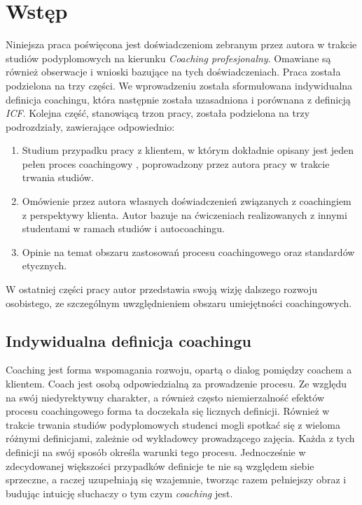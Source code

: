 \chapter{Wstęp}


Niniejsza praca poświęcona jest doświadczeniom zebranym przez autora w trakcie studiów podyplomowych na kierunku
\emph{Coaching profesjonalny}. Omawiane są również obserwacje i wnioski bazujące na tych doświadczeniach.
Praca została podzielona na trzy części. We wprowadzeniu została sformułowana indywidualna definicja coachingu,
która następnie została uzasadniona i porównana z definicją \emph{ICF}. Kolejna część, stanowiącą trzon pracy,
została podzielona na trzy podrozdziały, zawierające odpowiednio:
\begin{enumerate}
  \item Studium przypadku pracy z klientem, w którym dokładnie opisany jest jeden pełen proces coachingowy  , poprowadzony
      przez autora pracy w trakcie trwania studiów.
  \item Omówienie przez autora własnych doświadczenień związanych z coachingiem z perspektywy klienta. Autor bazuje na
      ćwiczeniach realizowanych z innymi studentami w ramach studiów i autocoachingu.
  \item Opinie na temat obszaru zastosowań procesu coachingowego oraz standardów etycznych.
\end{enumerate}
W ostatniej części pracy autor przedstawia swoją wizję dalszego rozwoju osobistego, ze szczególnym uwzględnieniem
obszaru umiejętności coachingowych. \\

\section{Indywidualna definicja coachingu}
Coaching jest forma wspomagania rozwoju, opartą o dialog pomiędzy coachem a klientem. Coach jest osobą odpowiedzialną za prowadzenie procesu.
Ze względu na swój niedyrektywny charakter, a również często niemierzalność efektów procesu coachingowego forma ta doczekała się
licznych definicji. Również w trakcie trwania studiów podyplomowych studenci mogli spotkać się z wieloma różnymi definicjami,
zależnie od wykładowcy prowadzącego zajęcia. Każda z tych definicji na swój sposób określa warunki tego procesu.
Jednocześnie w zdecydowanej większości przypadków definicje te nie są względem siebie sprzeczne, a raczej uzupełniają się
wzajemnie, tworząc razem pełniejszy obraz i budując intuicję słuchaczy o tym czym \emph{coaching} jest.

